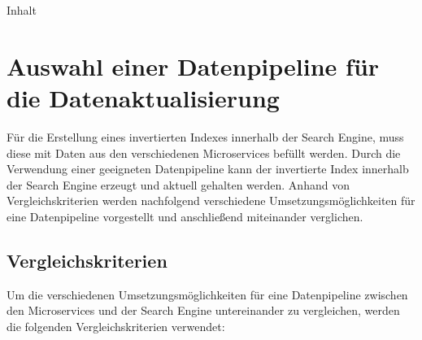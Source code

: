 Inhalt

\section{Auswahl einer Datenpipeline für die Datenaktualisierung\label{sec4.2:Unterpunkt-2}}

Für die Erstellung eines invertierten Indexes innerhalb der Search Engine, muss diese mit Daten aus den verschiedenen Microservices befüllt werden. Durch die Verwendung einer geeigneten Datenpipeline kann der invertierte Index innerhalb der Search Engine erzeugt und aktuell gehalten werden. Anhand von Vergleichskriterien werden nachfolgend verschiedene Umsetzungsmöglichkeiten für eine Datenpipeline vorgestellt und anschließend miteinander verglichen.

\subsection{Vergleichskriterien\label{subsec4.2.1:Unterunterpunkt-1}}

Um die verschiedenen Umsetzungsmöglichkeiten für eine Datenpipeline zwischen den Microservices und der Search Engine untereinander zu vergleichen, werden die folgenden Vergleichskriterien verwendet:

